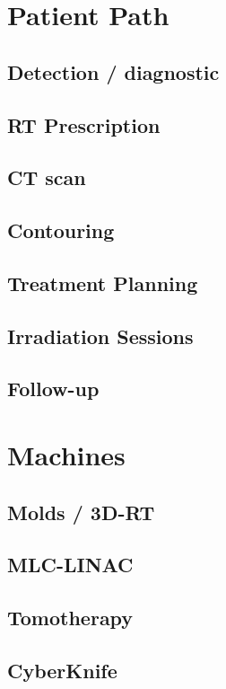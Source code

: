 \section{Patient Path}

\subsection{Detection / diagnostic}
\subsection{RT Prescription}
\subsection{CT scan}
\subsection{Contouring}
\subsection{Treatment Planning}
\subsection{Irradiation Sessions}
\subsection{Follow-up}

\section{Machines}
\subsection{Molds / 3D-RT}
\subsection{MLC-LINAC}
\subsection{Tomotherapy}
\subsection{CyberKnife}
